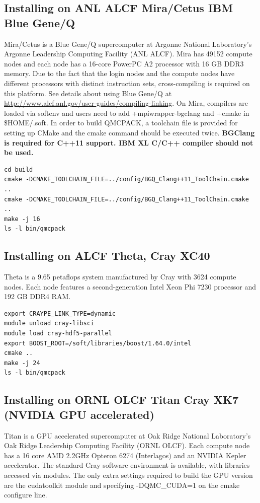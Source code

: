 \subsection{Installing on ANL ALCF Mira/Cetus IBM Blue Gene/Q}
\label{sec:buildbgq}
Mira/Cetus is a Blue Gene/Q supercomputer at Argonne National Laboratory's Argonne Leadership Computing Facility (ANL ALCF).
Mira has 49152 compute nodes and each node has a 16-core PowerPC A2 processor with 16 GB DDR3 memory.
Due to the fact that the login nodes and the compute nodes have different processors with distinct instruction sets,
cross-compiling is required on this platform. See details about using Blue Gene/Q at \url{http://www.alcf.anl.gov/user-guides/compiling-linking}.
On Mira, compilers are loaded via softenv and users need to add +mpiwrapper-bgclang and +cmake in \$HOME/.soft.
In order to build QMCPACK, a toolchain file is provided for setting up CMake and the cmake command should be executed twice.
\textbf{BGClang is required for C++11 support. IBM XL C/C++ compiler should not be used.}

\begin{verbatim}
cd build
cmake -DCMAKE_TOOLCHAIN_FILE=../config/BGQ_Clang++11_ToolChain.cmake ..
cmake -DCMAKE_TOOLCHAIN_FILE=../config/BGQ_Clang++11_ToolChain.cmake ..
make -j 16
ls -l bin/qmcpack
\end{verbatim}

\subsection{Installing on ALCF Theta, Cray XC40}
Theta is a 9.65 petaflops system manufactured by Cray with 3624 compute nodes.
Each node features a second-generation Intel Xeon Phi 7230 processor and 192 GB DDR4 RAM.

\begin{verbatim}
export CRAYPE_LINK_TYPE=dynamic
module unload cray-libsci
module load cray-hdf5-parallel
export BOOST_ROOT=/soft/libraries/boost/1.64.0/intel
cmake ..
make -j 24
ls -l bin/qmcpack
\end{verbatim}

\subsection{Installing on ORNL OLCF Titan Cray XK7 (NVIDIA GPU
  accelerated)}
\label{sec:titanbuildgpu}
Titan is a GPU accelerated supercomputer at Oak Ridge National
Laboratory's  Oak Ridge Leadership Computing Facility  (ORNL OLCF). Each
compute node has a 16 core AMD 2.2GHz Opteron 6274 (Interlagos) and an
NVIDIA Kepler accelerator. The standard Cray software environment is
available, with libraries accessed via modules. The only extra
settings required to build the GPU version are the cudatoolkit module
and specifying -DQMC\_CUDA=1 on the cmake configure line.

